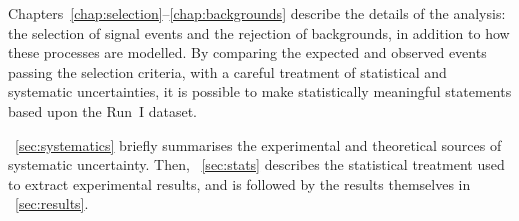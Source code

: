 
Chapters~\ref{chap:selection}--\ref{chap:backgrounds} describe the details of the \HWW 
analysis: the selection of signal events and the rejection of backgrounds, in addition to 
how these processes are modelled. By comparing the expected and observed events passing the 
selection criteria, with a careful treatment of statistical and systematic uncertainties, it 
is possible to make statistically meaningful statements based upon the Run~I dataset.

\Section~\ref{sec:systematics} briefly summarises the experimental and theoretical sources 
of systematic uncertainty. Then, \Section~\ref{sec:stats} describes the statistical 
treatment used to extract experimental results, and is followed by the results themselves in 
\Section~\ref{sec:results}.

